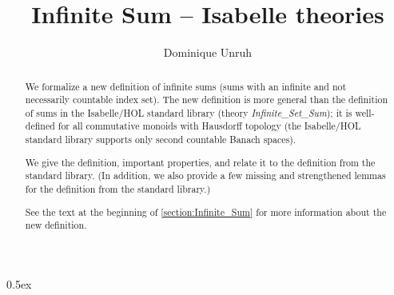 \documentclass[11pt,a4paper]{article}
\begin{document}
\title{Infinite Sum -- Isabelle theories}
\author{Dominique Unruh}
\maketitle

\begin{abstract}
  We formalize a new definition of infinite sums (sums with an infinite and not necessarily countable index set).
  The new definition is more general than the definition of sums in the Isabelle/HOL standard library (theory \textit{Infinite\_Set\_Sum});
  it is well-defined for all commutative monoids with Hausdorff topology
  (the Isabelle/HOL standard library supports only second countable Banach spaces).

  We give the definition, important properties, and relate it to the definition from the standard library.
  (In addition, we also provide a few missing and strengthened lemmas for the definition from the standard library.)

  See the text at the beginning of \autoref{section:Infinite_Sum} for more information about the new definition.
\end{abstract}


\tableofcontents

\parindent 0pt\parskip 0.5ex





\end{document}

